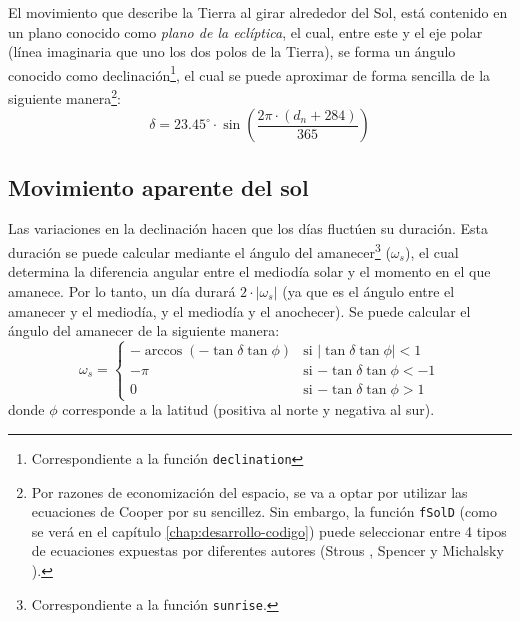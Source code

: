 El movimiento que describe la Tierra al girar alrededor del Sol, está contenido en un plano conocido como \emph{plano de la eclíptica}, el cual, entre este y el eje polar (línea imaginaria que uno los dos polos de la Tierra), se forma un ángulo conocido como declinación\footnote{Correspondiente a la función \texttt{declination}}, el cual se puede aproximar de forma sencilla de la siguiente manera\footnote{Por razones de economización del espacio, se va a optar por utilizar las ecuaciones de Cooper \cite{Cooper1969} por su sencillez. Sin embargo, la función \texttt{fSolD} (como se verá en el capítulo \ref{chap:desarrollo-codigo}) puede seleccionar entre 4 tipos de ecuaciones expuestas por diferentes autores (Strous \cite{Strous2011}, Spencer \cite{Spencer1971} y Michalsky \cite{Michalsky1988}).}: 
\begin{equation}
\delta=23.45^\circ \cdot \sin(\frac{2\pi \cdot (d_n+284)}{365})
\end{equation}

\subsection{Movimiento aparente del sol}
\label{sec:orgcac3476}
Las variaciones en la declinación hacen que los días fluctúen su duración. Esta duración se puede calcular mediante el ángulo del amanecer\footnote{Correspondiente a la función \texttt{sunrise}.} (\(\omega_s\)), el cual determina la diferencia angular entre el mediodía solar y el momento en el que amanece. Por lo tanto, un día durará \(2\cdot |\omega_s|\) (ya que es el ángulo entre el amanecer y el mediodía, y el mediodía y el anochecer). Se puede calcular el ángulo del amanecer de la siguiente manera: 
\begin{equation}
  \omega_s=\begin{cases}
  -\arccos(-\tan\delta\tan\phi)& \text{si $|\tan\delta\tan\phi|<1$}\\
  -\pi& \text{si $-\tan\delta\tan\phi<-1$}\\
  0& \text{si $-\tan\delta\tan\phi>1$}
  \end{cases}
\end{equation}
donde \(\phi\) corresponde a la latitud (positiva al norte y negativa al sur). 

